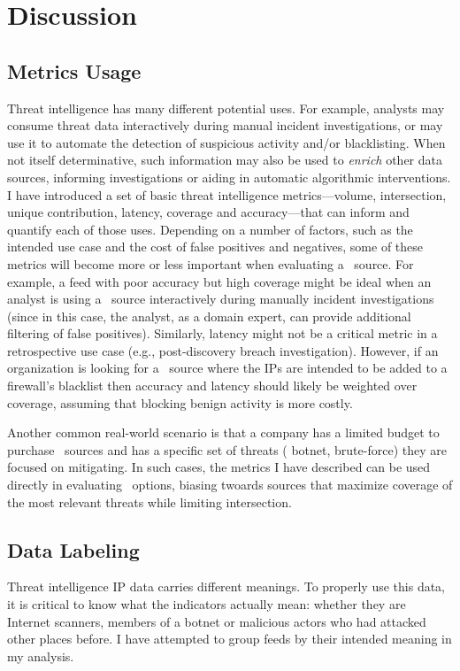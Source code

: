 \section{Discussion}
\label{sec:discussion}

\subsection{Metrics Usage}
Threat intelligence has many different potential uses. For example,
analysts may consume threat data interactively during manual
incident investigations, or may use it to automate the detection of
suspicious activity and/or blacklisting.  When not itself
determinative, such information may also be used to \emph{enrich}
other data sources, informing investigations or aiding in automatic
algorithmic interventions. I have introduced a set of basic threat
intelligence metrics---volume, intersection, unique contribution,
latency, coverage and accuracy---that can inform and quantify each of
those uses.  Depending on a number of factors, such as the intended
use case and the cost of false positives and negatives, some of
these metrics will become more or less important when evaluating a
\ti\ source. For example, a feed with poor accuracy but
high coverage might be ideal when an analyst is using a \ti\ source
interactively during manually incident investigations (since in this
case, the analyst, as a domain expert, can provide additional filtering
of false positives). Similarly, latency might not be a critical metric
in a retrospective use case (e.g., post-discovery breach
investigation).  However, if an organization is looking for a
\ti\ source where the IPs are intended to be added to a firewall's
blacklist then accuracy and latency should likely be weighted over
coverage, assuming that blocking benign activity is more costly.

Another common real-world scenario is that a company has a limited
budget to purchase \ti\ sources and has a specific set of threats (\ie
botnet, brute-force) they are focused on mitigating. In such cases,
the metrics I have described can be used directly in evaluating \ti\
options, biasing twoards sources that maximize coverage of the most
relevant threats while limiting intersection.


\subsection{Data Labeling}
Threat intelligence IP data carries different meanings. To properly use this
data, it is critical to know what the indicators actually mean: whether
they are Internet scanners, members of a botnet or malicious actors who
had attacked other places before. I have attempted to group feeds by their
intended meaning in my analysis.

